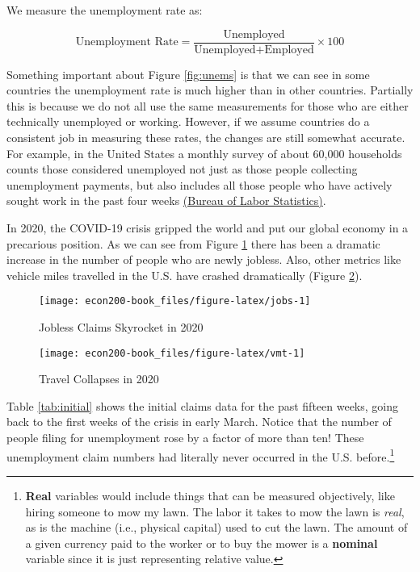 \documentclass[
]{book}
\begin{document}
We measure the unemployment rate as:

\[ \text{Unemployment Rate} = \frac{\text{Unemployed}}{\text{Unemployed} + \text{Employed}} \times 100 \]

Something important about Figure \ref{fig:unems} is that we can see in some countries the unemployment rate is much higher than in other countries. Partially this is because we do not all use the same measurements for those who are either technically unemployed or working. However, if we assume countries do a consistent job in measuring these rates, the changes are still somewhat accurate. For example, in the United States a monthly survey of about 60,000 households counts those considered unemployed not just as those people collecting unemployment payments, but also includes all those people who have actively sought work in the past four weeks \href{https://www.bls.gov/cps/cps_htgm.htm}{(Bureau of Labor Statistics)}.

In 2020, the COVID-19 crisis gripped the world and put our global economy in a precarious position. As we can see from Figure \ref{fig:jobs} there has been a dramatic increase in the number of people who are newly jobless. Also, other metrics like vehicle miles travelled in the U.S. have crashed dramatically (Figure \ref{fig:vmt}).

\begin{figure}

{\centering \texttt{[image: econ200-book\_files/figure-latex/jobs-1]} 

}

\caption{Jobless Claims Skyrocket in 2020}\label{fig:jobs}
\end{figure}

\begin{figure}

{\centering \texttt{[image: econ200-book\_files/figure-latex/vmt-1]} 

}

\caption{Travel Collapses in 2020}\label{fig:vmt}
\end{figure}

Table \ref{tab:initial} shows the initial claims data for the past fifteen weeks, going back to the first weeks of the crisis in early March. Notice that the number of people filing for unemployment rose by a factor of more than ten! These unemployment claim numbers had literally never occurred in the U.S. before.\footnote{\textbf{Real} variables would include things that can be measured objectively, like hiring someone to mow my lawn. The labor it takes to mow the lawn is \emph{real}, as is the machine (i.e., physical capital) used to cut the lawn. The amount of a given currency paid to the worker or to buy the mower is a \textbf{nominal} variable since it is just representing relative value.}
\end{document}
